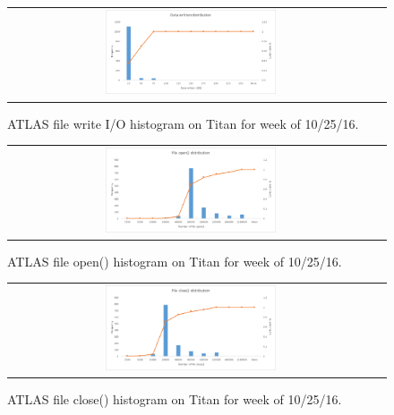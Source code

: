 \begin{figure}[!htb]
    \centering
    \begin{tabular}{cc}
        {\includegraphics[width=0.48\textwidth]{figures/panda_data_written_hist.pdf}}\\
    \end{tabular}
    \caption{ATLAS file write I/O histogram on Titan for week of 10/25/16.}
    \label{fig:atlas-titan-io-written}
\end{figure}


\begin{figure}[!htb]
    \centering
    \begin{tabular}{cc}
        {\includegraphics[width=0.48\textwidth]{figures/panda_file_open_hist.pdf}}\\
    \end{tabular}
    \caption{ATLAS file open() histogram on Titan for week of 10/25/16.}
    \label{fig:atlas-titan-file-open}
\end{figure}


\begin{figure}[!htb]
    \centering
    \begin{tabular}{cc}
        {\includegraphics[width=0.48\textwidth]{figures/panda_file_close_hist.pdf}}\\
    \end{tabular}
    \caption{ATLAS file close() histogram on Titan for week of 10/25/16.}
    \label{fig:atlas-titan_file_close}
\end{figure}




